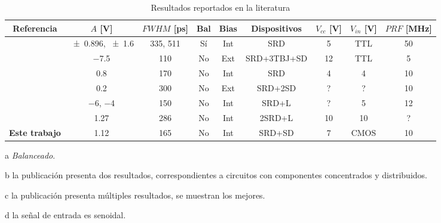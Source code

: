 \begin{table}
  \begin{threeparttable}[b]
    \label{tab:resultados_literatura}
    {\footnotesize
    \begin{tabular}{ccccccccc}
        \hline
        Referencia & $A$ [\unit{\volt}] & $FWHM$ [\unit{\pico\second}] &
        Bal \tnote{a} & Bias & Dispositivos & $V_{cc}$ [\unit{\volt}] & $V_{in}$ [\unit{\volt}] & $PRF$ [\unit{\mega\hertz}] \\
        \hline
        \cite{rulikowski2004} & \num{\pm 0.896}, \num{\pm 1.6} \tnote{b} & 335, 511 & Sí & Int & SRD & 5 & TTL & 50 \\
        \cite{protiva2009} & \num{-7.5} & 110 & No & Ext & SRD+3TBJ+SD & 12 & TTL & 5 \\
        \cite{kamal2014} & \num{0.8} & 170 & No & Int & SRD & 4 & 4 & 10 \\
        \cite{han2002} & \num{0.2} & 300 & No & Ext & SRD+2SD & ? & ? & 10 \\
        \cite{han2005} & \num{-6}, \num{-4} & 150 & No & Int & SRD+L & ? & 5 & 12 \\
        \cite{oloumi2018} & \num{1.27} \tnote{c} & 286 & No & Int & 2SRD+L & 10 & 10 \tnote{d} & ? \\
        \textbf{Este trabajo} & \num{1.12} & 165 & No & Int & SRD+SD & 7 & CMOS  &
        \num{10} \\
    \end{tabular}
}
   \begin{tablenotes}
     \item [a] \textit{Balanceado}.
     \item [b] la publicación presenta dos resultados, correspondientes a
       circuitos con componentes concentrados y distribuidos.
     \item [c] la publicación presenta múltiples resultados, se muestran
       los mejores.
     \item [d] la señal de entrada es senoidal.
   \end{tablenotes}
  \end{threeparttable}
  \caption{Resultados reportados en la literatura}
\end{table}

